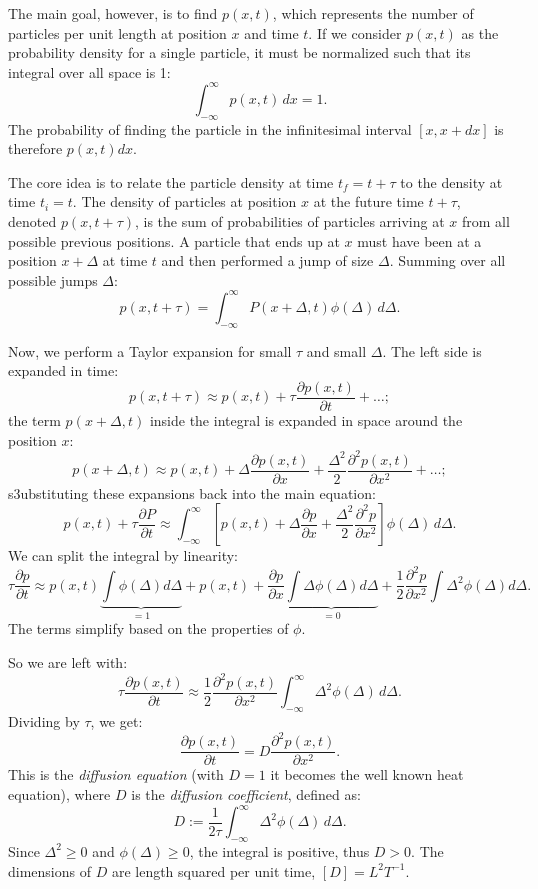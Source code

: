The main goal, however, is to find $p(x,t)$, which represents the number of particles per unit length at position $x$ and time $t$. If we consider $p(x,t)$ as the probability density for a single particle, it must be normalized such that its integral over all space is 1:
\[
\int_{-\infty}^{\infty} p(x,t) \,dx = 1.
\]
The probability of finding the particle in the infinitesimal interval $[x, x+dx]$ is therefore $p(x,t)dx$.

The core idea is to relate the particle density at time $t_f = t+\tau$ to the density at time $t_i = t$. The density of particles at position $x$ at the future time $t+\tau$, denoted $p(x, t+\tau)$, is the sum of probabilities of particles arriving at $x$ from all possible previous positions. A particle that ends up at $x$ must have been at a position $x+\Delta$ at time $t$ and then performed a jump of size $\Delta$. Summing over all possible jumps $\Delta$:
\[
p(x, t+\tau) = \int_{-\infty}^{\infty} P(x+\Delta, t) \phi(\Delta) \,d\Delta.
\]

Now, we perform a Taylor expansion for small $\tau$ and small $\Delta$. The left side is expanded in time:
\[
p(x, t+\tau) \approx p(x,t) + \tau \frac{\partial p(x,t)}{\partial t} + \dots;
\]
the term $p(x+\Delta, t)$ inside the integral is expanded in space around the position $x$:
\[
p(x+\Delta, t) \approx p(x,t) + \Delta \frac{\partial p(x,t)}{\partial x} + \frac{\Delta^2}{2} \frac{\partial^2 p(x,t)}{\partial x^2} + \dots;
\]
s3ubstituting these expansions back into the main equation:
\[
p(x,t) + \tau \frac{\partial P}{\partial t} \approx \int_{-\infty}^{\infty} \left[ p(x,t) + \Delta \frac{\partial p}{\partial x} + \frac{\Delta^2}{2} \frac{\partial^2 p}{\partial x^2} \right] \phi(\Delta) \,d\Delta.
\]
We can split the integral by linearity:
\[
\tau \frac{\partial p}{\partial t} \approx p(x,t) \underbrace{\int \phi(\Delta)d\Delta}_{=1} + p(x,t) + \frac{\partial p}{\partial x} \underbrace{\int \Delta \phi(\Delta)d\Delta}_{=0} + \frac{1}{2}\frac{\partial^2 p}{\partial x^2} \int \Delta^2 \phi(\Delta)d\Delta.
\]
The terms simplify based on the properties of $\phi$.

So we are left with:
\[
\tau \frac{\partial p(x,t)}{\partial t} \approx \frac{1}{2}\frac{\partial^2 p(x,t)}{\partial x^2} \int_{-\infty}^{\infty} \Delta^2 \phi(\Delta) \,d\Delta.
\]
Dividing by $\tau$, we get:
\[
\frac{\partial p(x,t)}{\partial t} = D \frac{\partial^2 p(x,t)}{\partial x^2}.
\]
This is the \emph{diffusion equation} (with $D=1$ it becomes the well known heat equation), where $D$ is the \emph{diffusion coefficient}, defined as:
\[
D := \frac{1}{2\tau} \int_{-\infty}^{\infty} \Delta^2 \phi(\Delta) \,d\Delta.
\]
Since $\Delta^2 \ge 0$ and $\phi(\Delta) \ge 0$, the integral is positive, thus $D>0$. The dimensions of $D$ are length squared per unit time, $[D] = L^2 T^{-1}$.


